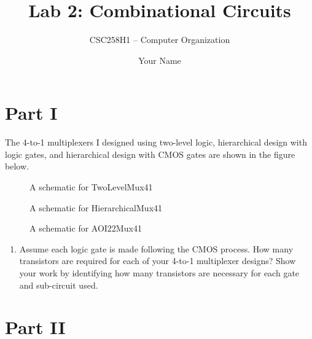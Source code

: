 \documentclass[parskip=half]{scrarticle}
\title{Lab 2: Combinational Circuits}
\subtitle{CSC258H1 -- Computer Organization}
\author{Your Name}
\begin{document}
\maketitle

\section*{Part I}

The 4-to-1 multiplexers I designed using two-level logic, hierarchical design with logic gates, and hierarchical design with CMOS gates are shown in the figure below.

\begin{figure}[ht!]
    \centering
    \caption{A schematic for TwoLevelMux41}
\end{figure}

\begin{figure}[ht!]
    \centering
    \caption{A schematic for HierarchicalMux41}
\end{figure}

\begin{figure}[ht!]
    \centering
    \caption{A schematic for AOI22Mux41}
\end{figure}

\begin{enumerate}
\item Assume each logic gate is made following the CMOS process.
How many transistors are required for each of your 4-to-1 multiplexer designs?
Show your work by identifying how many transistors are necessary for each gate and sub-circuit used.
\end{enumerate}

\section*{Part II}
\end{document}
